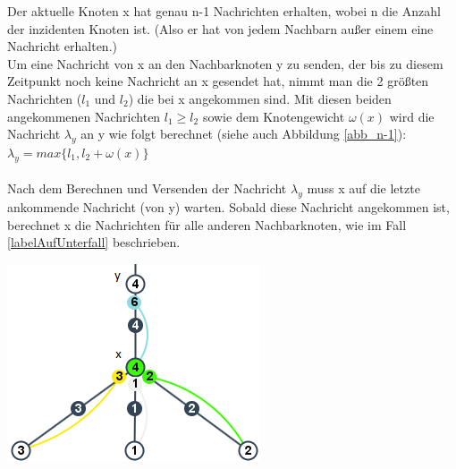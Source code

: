 \begin{enumerate}
		Der aktuelle Knoten x hat genau n-1 Nachrichten erhalten, wobei n die Anzahl der inzidenten Knoten ist. (Also er hat von jedem Nachbarn außer einem eine Nachricht erhalten.)
		\\
	
		
		Um eine Nachricht von x an den Nachbarknoten y zu senden, der bis zu diesem Zeitpunkt noch keine Nachricht an x gesendet hat, nimmt man die 2 größten Nachrichten ($l_{1}$ und $l_{2}$) die bei x angekommen sind. Mit diesen beiden angekommenen Nachrichten $l_{1} \ge l_{2}$ sowie dem Knotengewicht $\omega(x)$ wird die Nachricht $\lambda_{y}$ an y wie folgt berechnet (siehe auch Abbildung \ref{abb_n-1}): $\lambda_{y} = max\{l_{1},  l_{2} + \omega(x)\}$
		\\
		\\	
		Nach dem Berechnen und Versenden der Nachricht $\lambda_{y}$ muss x auf die letzte ankommende Nachricht (von y) warten. Sobald diese Nachricht angekommen ist, berechnet x die Nachrichten für alle anderen Nachbarknoten, wie im Fall \ref{labelAufUnterfall} beschrieben. 
		
		\includegraphics[width=\textwidth]{bilder/abb_paper_n-1knoten.png}
		\label{abb_n-1}
		

\end{enumerate}
